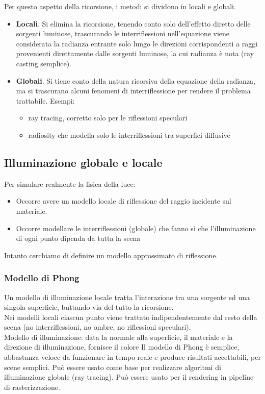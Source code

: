 \documentclass[a4paper, 10pt]{article}
\begin{document}
		\noindent
		Per questo aspetto della ricorsione, i metodi si dividono in locali e globali.
		\begin{itemize}
			\item \textbf{Locali}. Si elimina la ricorsione, tenendo conto solo dell’effetto
			diretto delle sorgenti luminose, trascurando le interriflessioni
			nell’equazione viene considerata la radianza entrante solo lungo le
			direzioni corrispondenti a raggi provenienti direttamente dalle
			sorgenti luminose, la cui radianza è nota (ray casting semplice).
			\item \textbf{Globali}. Si tiene conto della natura ricorsiva della equazione
			della radianza, ma si trascurano alcuni fenomeni di
			interriflessione per rendere il problema trattabile. Esempi:
			\begin{itemize}
				\item ray tracing, corretto solo per le riflessioni speculari
				\item radiosity che modella solo le interriflessioni tra superfici diffusive
			\end{itemize}
		\end{itemize}
		
		
	\subsection{Illuminazione globale e locale}
		Per simulare realmente la fisica della luce:
		\begin{itemize}
			\item Occorre avere un modello locale di riflessione del raggio incidente sul
			materiale.
			\item Occorre modellare le interriflessioni (globale) che fanno sì
			che l'illuminazione di ogni punto dipenda da tutta la scena
		\end{itemize}
		Intanto cerchiamo di definire un modello approssimato di riflessione.
		
		\subsubsection{Modello di Phong}
			Un modello di illuminazione locale tratta l’interazione tra una
			sorgente ed una singola superficie, buttando via del tutto la
			ricorsione.\\
			Nei modelli locali ciascun punto viene trattato
			indipendentemente dal resto della scena (no interriflessioni,
			no ombre, no riflessioni speculari).\\
			Modello di illuminazione: data la normale alla superficie, il
			materiale e la direzione di illuminazione, fornisce il colore
			Il modello di Phong è semplice, abbastanza veloce
			da funzionare in tempo reale e produce risultati accettabili, per
			scene semplici.	Può essere usato come base per realizzare algoritmi di illuminazione
			globale (ray tracing). Può essere usato per il rendering in pipeline di rasterizzazione.
		
\end{document}
